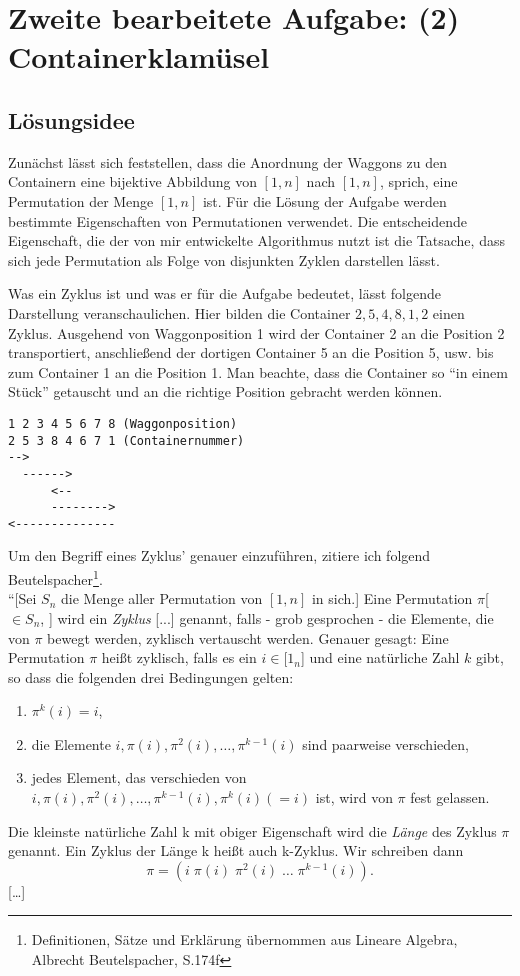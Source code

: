 \lstset{language=Scala}
\chapter{Zweite bearbeitete Aufgabe: (2) Containerklamüsel}
\minitoc
\clearpage
\section{Lösungsidee}
Zunächst lässt sich feststellen,
dass die Anordnung der Waggons zu den Containern eine bijektive Abbildung von $[1,n]$ nach $[1,n]$, sprich, eine Permutation der Menge $[1,n]$ ist.
Für die Lösung der Aufgabe werden bestimmte Eigenschaften von Permutationen verwendet. 
Die entscheidende Eigenschaft, die der von mir entwickelte Algorithmus nutzt ist die Tatsache,
dass sich jede Permutation als Folge von disjunkten Zyklen darstellen lässt.

Was ein Zyklus ist und was er für die Aufgabe bedeutet, lässt folgende Darstellung veranschaulichen.
Hier bilden die Container $2,5,4,8,1,2$ einen Zyklus. Ausgehend von Waggonposition 1 wird der Container 2 an die Position 2 transportiert,
anschließend der dortigen Container 5 an die Position 5, usw. bis zum Container 1 an die Position 1.
Man beachte, dass die Container so ``in einem Stück'' getauscht und an die richtige Position gebracht werden können.
\lstset{basicstyle=\ttfamily}
\begin{lstlisting}
1 2 3 4 5 6 7 8 (Waggonposition)
2 5 3 8 4 6 7 1 (Containernummer)
-->
  ------>
      <--
      -------->
<--------------
\end{lstlisting}
\lstset{basicstyle=\ttfamily}
Um den Begriff eines Zyklus' genauer einzuführen, zitiere ich folgend Beutelspacher\footnote{Definitionen, Sätze und Erklärung übernommen aus Lineare Algebra, Albrecht Beutelspacher, S.174f}.
\\
``[Sei $S_n$ die Menge aller Permutation von $[1,n]$ in sich.]
Eine Permutation $\pi$[$\in S_n$, ] wird ein \emph{Zyklus} [...] genannt, falls - grob gesprochen - die Elemente, die von $\pi$ bewegt werden,
zyklisch vertauscht werden. Genauer gesagt: Eine Permutation $\pi$ heißt zyklisch,
falls es ein $ i \in $[$1_n$] und eine natürliche Zahl $k$ gibt, so dass die folgenden drei Bedingungen gelten:
\begin{enumerate}
 \item $\pi^k(i) = i$,
 \item die Elemente $i,\pi(i),\pi^2(i),\dots,\pi^{k-1}(i)$ sind paarweise verschieden,
 \item jedes Element, das verschieden von $i,\pi(i),\pi^2(i),\dots,\pi^{k-1}(i), \pi^k(i) (=i)$ ist, wird von $\pi$ fest gelassen.
\end{enumerate}
Die kleinste natürliche Zahl k mit obiger Eigenschaft wird die \emph{Länge} des Zyklus $\pi$ genannt.
Ein Zyklus der Länge k heißt auch k-Zyklus. Wir schreiben dann \[\pi=(i\;\pi(i)\;\pi^2(i) \; \dots \;\pi^{k-1}(i)).\]
[\dots]
